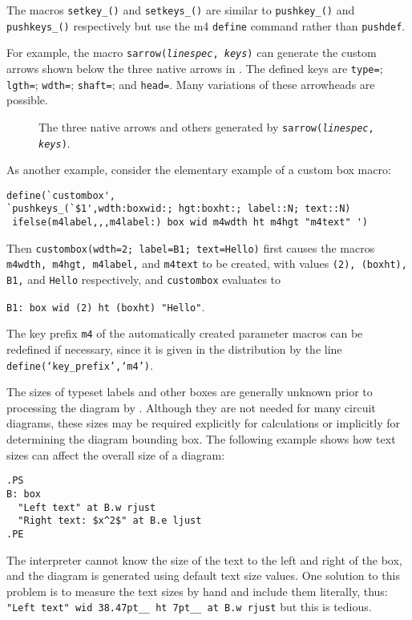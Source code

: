 The macros {\tt setkey\_()} and {\tt setkeys\_()} are similar to
{\tt pushkey\_()} and {\tt pushkeys\_()} respectively but use the
m4 {\tt define} command rather than {\tt pushdef}.

For example, the macro
{\tt sarrow({\sl linespec}, {\sl keys})}
can generate the custom arrows shown below the three native arrows
in .  The defined keys are
 {\tt type=}; {\tt lgth=}; {\tt wdth=}; {\tt shaft=}; and {\tt head=}. 
Many variations of these arrowheads are possible.
\begin{figure}[H]
   
   \caption{The three \dpic native arrows and others generated by
    {\tt sarrow({\sl linespec}, {\sl keys})}.}
   \label{arrowex}
   \end{figure}

As another example, consider the elementary example of a custom box macro:

\begin{verbatim}
define(`custombox',
`pushkeys_(`$1',wdth:boxwid:; hgt:boxht:; label::N; text::N)
 ifelse(m4label,,,m4label:) box wid m4wdth ht m4hgt "m4text" ')
\end{verbatim}

Then {\tt custombox(wdth=2; label=B1; text=Hello)}
first causes the macros {\tt m4wdth, m4hgt, m4label,} and {\tt m4text}
to be created, with values {\tt (2), (boxht), B1,} and {\tt Hello}
respectively, and {\tt custombox} evaluates to

{\tt B1:\ box wid (2) ht (boxht) "Hello"}.

The key prefix {\tt m4} of the automatically created parameter macros can be
redefined if necessary, since it is given in the distribution by the line
{\tt define(`key\_prefix',`m4')}.


The sizes of typeset labels and other \tex boxes are generally unknown
prior to processing the diagram by \latex.
Although they are not needed for many circuit diagrams,
these sizes may be required explicitly for calculations or implicitly
for determining the diagram bounding box.  
The following example shows how text sizes can affect the overall size of
a diagram:

\begin{verbatim}
.PS
B: box
  "Left text" at B.w rjust
  "Right text: $x^2$" at B.e ljust
.PE
\end{verbatim}

The \pic interpreter cannot know the size of the text to the left
and right of the box, and the diagram is generated using
default text size values.  One solution to this problem is to measure the
text sizes by hand and include them literally, thus:\hfill\break
\hbox{}\quad%
\verb|"Left text" wid 38.47pt__ ht 7pt__ at B.w rjust|\hfill\break
but this is tedious.

